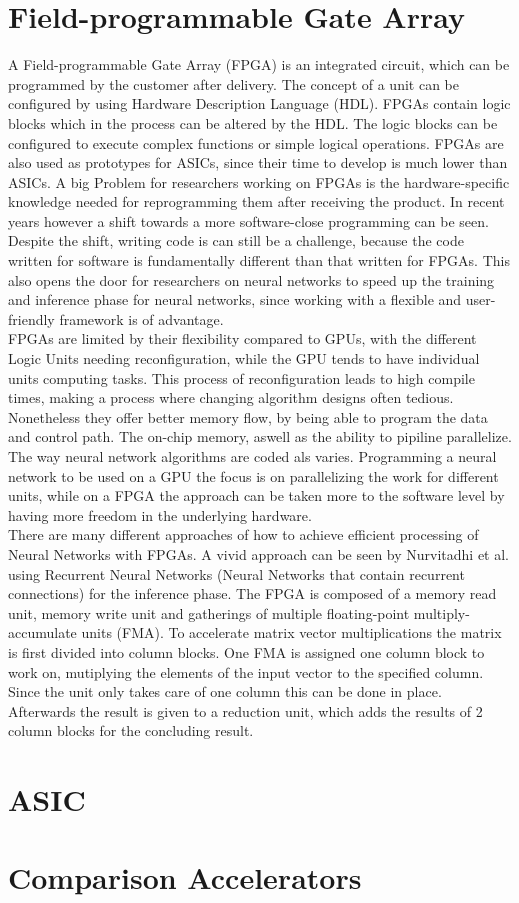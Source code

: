 \documentclass[conference]{IEEEtran}
\begin{document}
\section{Field-programmable Gate Array}
A Field-programmable Gate Array (FPGA) is an integrated circuit, which can be programmed by the customer after delivery. The concept of a unit can be configured by using Hardware Description Language (HDL). FPGAs contain logic blocks which in the process can be altered by the HDL. The logic blocks can be configured to execute complex functions or simple logical operations. FPGAs are also used as prototypes for ASICs, since their time to develop is much lower than ASICs. A big Problem for researchers working on FPGAs is the hardware-specific knowledge needed for reprogramming them after receiving the product. In recent years however a shift towards a more software-close programming can be seen. Despite the shift, writing code is can still be a challenge, because the code written for software is fundamentally different than that written for FPGAs. This also opens the door for researchers on neural networks to speed up the training and inference phase for neural networks, since working with a flexible and user-friendly framework is of advantage.
\\
FPGAs are limited by their flexibility compared to GPUs, with the different Logic Units needing reconfiguration, while the GPU tends to have individual units computing tasks. This process of reconfiguration leads to high compile times, making a process where changing algorithm designs often tedious. Nonetheless they offer better memory flow, by being able to program the data and control path. The on-chip memory, aswell as the ability to pipiline parallelize. The way neural network algorithms are coded als varies. Programming a neural network to be used on a GPU the focus is on parallelizing the work for different units, while on a FPGA the approach can be taken more to the software level by having more freedom in the underlying hardware.
\\
There are many different approaches of how to achieve efficient processing of Neural Networks with FPGAs. A vivid approach can be seen by Nurvitadhi et al. \cite{nurvitadhi2016accelerating} using Recurrent Neural Networks (Neural Networks that contain recurrent connections) for the inference phase. The FPGA is composed of a memory read unit, memory write unit and gatherings of multiple floating-point multiply-accumulate units (FMA). To accelerate matrix vector multiplications the matrix is first divided into column blocks. One FMA is assigned one column block to work on, mutiplying the elements of the input vector to the specified column. Since the unit only takes care of one column this can be done in place. Afterwards the result is given to a reduction unit, which adds the results of 2 column blocks for the concluding result.


\section{ASIC}

\section{Comparison Accelerators}

\newpage
\quad
\newpage


\end{document}
